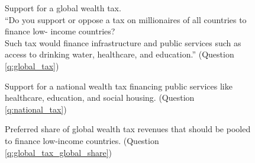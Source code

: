 \begin{figure}[h!]
    \caption[Support for a global wealth tax]{Support for a global wealth tax. \\
    ``Do you support or oppose a tax on millionaires of all countries to finance low-
    income countries? \\
    Such tax would finance infrastructure and public services such as access to drinking water, healthcare, and education.'' (Question \ref{q:global_tax})}\label{fig:global_tax}
\end{figure}

\begin{figure}[h!]
    \caption[Support for a national wealth tax]{Support for a national wealth tax financing public services like healthcare, education, and social housing. (Question \ref{q:national_tax})}\label{fig:national_tax}
\end{figure}

\begin{figure}[h!]
    \caption[Preferred share of global tax for low-income countries]{Preferred share of global wealth tax revenues that should be pooled to finance low-income countries. (Question \ref{q:global_tax_global_share})}\label{fig:global_tax_global_share}
\end{figure}

